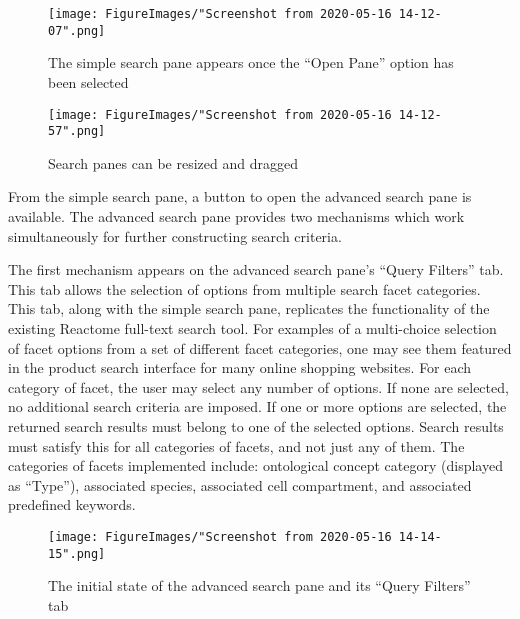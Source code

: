 \documentclass[12pt]{report}
\begin{document}
\begin{figure}[h!]
	\begin{center}
		\texttt{[image: FigureImages/"Screenshot from 2020-05-16 14-12-07".png]}
	\end{center}
	\caption{The simple search pane appears once the ``Open Pane'' option has been selected}
	\label{fig:SimpleSearchPaneAppears}
\end{figure}

\begin{figure}[h!]
	\begin{center}
		\texttt{[image: FigureImages/"Screenshot from 2020-05-16 14-12-57".png]}
	\end{center}
	\caption{Search panes can be resized and dragged}
	\label{fig:PaneResizeAndDrag}
\end{figure}
\newpage

From the simple search pane, a button to open the advanced search pane is available. The advanced search pane provides two mechanisms which work simultaneously for further constructing search criteria.

The first mechanism appears on the advanced search pane's ``Query Filters'' tab. This tab allows the selection of options from multiple search facet categories. This tab, along with the simple search pane, replicates the functionality of the existing Reactome full-text search tool. For examples of a multi-choice selection of facet options from a set of different facet categories, one may see them featured in the product search interface for many online shopping websites. For each category of facet, the user may select any number of options. If none are selected, no additional search criteria are imposed. If one or more options are selected, the returned search results must belong to one of the selected options. Search results must satisfy this for all categories of facets, and not just any of them. The categories of facets implemented include: ontological concept category (displayed as ``Type''), associated species, associated cell compartment, and associated predefined keywords.

\begin{figure}[h!]
	\begin{center}
		\texttt{[image: FigureImages/"Screenshot from 2020-05-16 14-14-15".png]}
	\end{center}
	\caption{The initial state of the advanced search pane and its ``Query Filters'' tab}
	\label{fig:AdvancedSearchInitial}
\end{figure}
\end{document}
